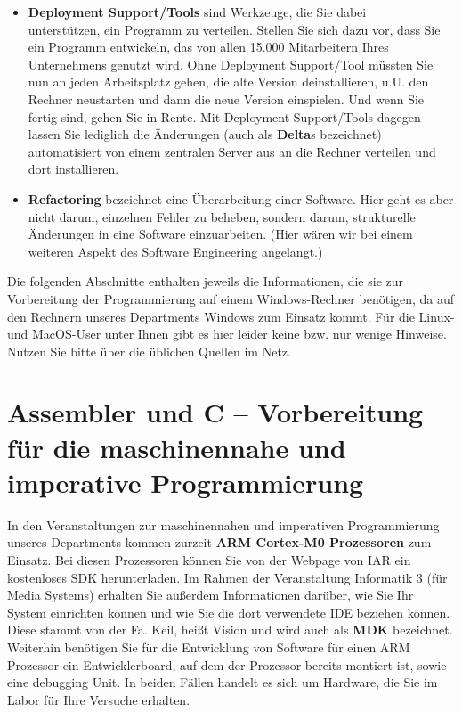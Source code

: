 \begin{itemize}
	\item \textbf{Deployment Support/Tools} sind Werkzeuge, die Sie dabei \\unterstützen, ein Programm zu verteilen. Stellen Sie sich dazu vor, dass Sie ein Programm entwickeln, das von allen 15.000 Mitarbeitern Ihres Unternehmens genutzt wird. Ohne Deployment Support/Tool müssten Sie nun an jeden Arbeitsplatz gehen, die alte Version deinstallieren, u.U. den Rechner neustarten und dann die neue Version einspielen. Und wenn Sie fertig sind, gehen Sie in Rente. Mit Deployment Support/Tools dagegen lassen Sie lediglich die Änderungen (auch als \textbf{Delta}s bezeichnet) automatisiert von einem zentralen Server aus an die Rechner verteilen und dort installieren.
	\item \textbf{Refactoring} bezeichnet eine Überarbeitung einer Software. Hier geht es aber nicht darum, einzelnen Fehler zu beheben, sondern darum, strukturelle Änderungen in eine Software einzuarbeiten. (Hier wären wir bei einem weiteren Aspekt des Software Engineering angelangt.)
\end{itemize}

Die folgenden Abschnitte enthalten jeweils die Informationen, die sie zur Vorbereitung der Programmierung auf einem Windows-Rechner benötigen, da auf den Rechnern unseres Departments Windows zum Einsatz kommt. Für die Linux- und MacOS-User unter Ihnen gibt es hier leider keine bzw. nur wenige Hinweise. Nutzen Sie bitte über die üblichen Quellen im Netz.

\section{Assembler und C – Vorbereitung für die maschinennahe und imperative Programmierung}

In den Veranstaltungen zur maschinennahen und imperativen Programmierung unseres Departments kommen zurzeit \textbf{ARM Cortex-M0 Prozessoren} zum Einsatz. Bei diesen Prozessoren können Sie von der Webpage von IAR ein kostenloses SDK herunterladen. Im Rahmen der Veranstaltung Informatik 3 (für Media Systems) erhalten Sie außerdem Informationen darüber, wie Sie Ihr System einrichten können und wie Sie die dort verwendete IDE beziehen können. Diese stammt von der Fa. Keil, heißt \textmu Vision und wird auch als \textbf{MDK} bezeichnet. Weiterhin benötigen Sie für die Entwicklung von Software für einen ARM Prozessor ein Entwicklerboard, auf dem der Prozessor bereits montiert ist, sowie eine debugging Unit. In beiden Fällen handelt es sich um Hardware, die Sie im Labor für Ihre Versuche erhalten.\\

